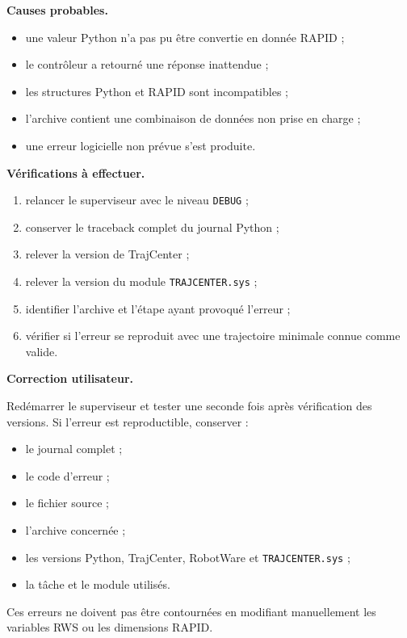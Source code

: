\documentclass{rapportENSAM}
\begin{document}
\textbf{Causes probables.}

\begin{itemize}
\item une valeur Python n'a pas pu être convertie en donnée RAPID ;
\item le contrôleur a retourné une réponse inattendue ;
\item les structures Python et RAPID sont incompatibles ;
\item l'archive contient une combinaison de données non prise en charge ;
\item une erreur logicielle non prévue s'est produite.
\end{itemize}

\textbf{Vérifications à effectuer.}

\begin{enumerate}
\item relancer le superviseur avec le niveau \texttt{DEBUG} ;
\item conserver le traceback complet du journal Python ;
\item relever la version de TrajCenter ;
\item relever la version du module \texttt{TRAJCENTER.sys} ;
\item identifier l'archive et l'étape ayant provoqué l'erreur ;
\item vérifier si l'erreur se reproduit avec une trajectoire minimale
connue comme valide.
\end{enumerate}

\textbf{Correction utilisateur.}

Redémarrer le superviseur et tester une seconde fois après vérification des
versions. Si l'erreur est reproductible, conserver :

\begin{itemize}
\item le journal complet ;
\item le code d'erreur ;
\item le fichier source ;
\item l'archive concernée ;
\item les versions Python, TrajCenter, RobotWare et
\texttt{TRAJCENTER.sys} ;
\item la tâche et le module utilisés.
\end{itemize}

Ces erreurs ne doivent pas être contournées en modifiant manuellement les
variables RWS ou les dimensions RAPID.

\end{document}
